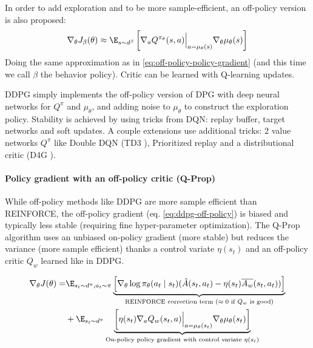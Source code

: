 In order to add exploration and to be more sample-efficient, an off-policy version is also proposed:
\begin{equation}
    \nabla_\theta J_\beta(\theta) \approx \E_{s\sim d^\beta} \left[
        \nabla_a Q^{\pi_\theta}(s,a) \Bigr|_{a=\mu_\theta(s)} \nabla_\theta \mu_\theta(s)
    \right]
\label{eq:ddpg-off-policy}
\end{equation}
Doing the same approximation as in \ref{eq:off-policy-policy-gradient} (and this time we call $\beta$ the behavior policy). Critic can be learned with Q-learning updates.

DDPG simply implements the off-policy version of DPG with deep neural networks for $Q^\pi$ and $\mu_\theta$, and adding noise to $\mu_\theta$ to construct the exploration policy. Stability is achieved by using tricks from DQN: replay buffer, target networks and soft updates. A couple extensions use additional tricks: 2 value networks $Q^\pi$ like Double DQN (TD3 \cite{fujimoto2018addressing}), Prioritized replay and a distributional critic (D4G \cite{barth2018distributed}).


\paragraph{Policy gradient with an off-policy critic (Q-Prop)} \cite{gu2016q}
While off-policy methods like DDPG are more sample efficient than REINFORCE, the off-policy gradient (eq. \ref{eq:ddpg-off-policy}) is biased and typically less stable (requiring fine hyper-parameter optimization). The Q-Prop algorithm uses an unbiased on-policy gradient (more stable) but reduces the variance (more sample efficient) thanks a control variate $\eta(s_t)$ and an off-policy critic $Q_w$ learned like in DDPG.

\begin{align}
    \nabla_\theta J(\theta) = 
    & \E_{s_t\sim d^\pi, a_t \sim \pi} \underbrace{
        \left[
            \nabla_\theta \log \pi_\theta(a_t\mid s_t) (\hat{A}(s_t,a_t) - \eta(s_t) \overline{A_w}(s_t,a_t))
        \right]
    }_{
        \text{REINFORCE correction term ($\approx 0$ if $Q_w$ is good)}
    }
    \nonumber \\
    & + \E_{s_t\sim d^\pi} \underbrace{
        \left[
            \eta(s_t) \nabla_a Q_w(s_t,a) \Bigr|_{a=\mu_\theta(s_t)} \nabla_\theta \mu_\theta(s_t)
        \right]
    }_{
        \text{On-policy policy gradient with control variate $\eta(s_t)$}
    }
\end{align}

